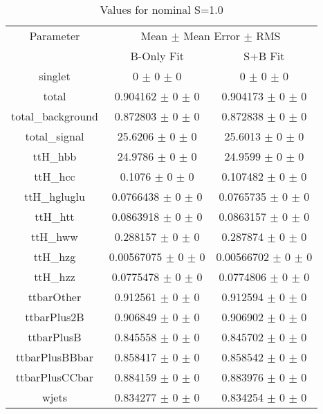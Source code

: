 \begin{table}
\centering
\caption{Values for nominal S=1.0}
\begin{tabular}{ccc}
\toprule
Parameter 	& \multicolumn{2}{c}{Mean $\pm$ Mean Error $\pm$ RMS}\\
 	& B-Only Fit & S+B Fit\\
\midrule
singlet 	& \num{0} $\pm$ \num{0} $\pm$ \num{0} 	& \num{0} $\pm$ \num{0} $\pm$ \num{0}\\
total 	& \num{0.904162} $\pm$ \num{0} $\pm$ \num{0} 	& \num{0.904173} $\pm$ \num{0} $\pm$ \num{0}\\
total\_background 	& \num{0.872803} $\pm$ \num{0} $\pm$ \num{0} 	& \num{0.872838} $\pm$ \num{0} $\pm$ \num{0}\\
total\_signal 	& \num{25.6206} $\pm$ \num{0} $\pm$ \num{0} 	& \num{25.6013} $\pm$ \num{0} $\pm$ \num{0}\\
ttH\_hbb 	& \num{24.9786} $\pm$ \num{0} $\pm$ \num{0} 	& \num{24.9599} $\pm$ \num{0} $\pm$ \num{0}\\
ttH\_hcc 	& \num{0.1076} $\pm$ \num{0} $\pm$ \num{0} 	& \num{0.107482} $\pm$ \num{0} $\pm$ \num{0}\\
ttH\_hgluglu 	& \num{0.0766438} $\pm$ \num{0} $\pm$ \num{0} 	& \num{0.0765735} $\pm$ \num{0} $\pm$ \num{0}\\
ttH\_htt 	& \num{0.0863918} $\pm$ \num{0} $\pm$ \num{0} 	& \num{0.0863157} $\pm$ \num{0} $\pm$ \num{0}\\
ttH\_hww 	& \num{0.288157} $\pm$ \num{0} $\pm$ \num{0} 	& \num{0.287874} $\pm$ \num{0} $\pm$ \num{0}\\
ttH\_hzg 	& \num{0.00567075} $\pm$ \num{0} $\pm$ \num{0} 	& \num{0.00566702} $\pm$ \num{0} $\pm$ \num{0}\\
ttH\_hzz 	& \num{0.0775478} $\pm$ \num{0} $\pm$ \num{0} 	& \num{0.0774806} $\pm$ \num{0} $\pm$ \num{0}\\
ttbarOther 	& \num{0.912561} $\pm$ \num{0} $\pm$ \num{0} 	& \num{0.912594} $\pm$ \num{0} $\pm$ \num{0}\\
ttbarPlus2B 	& \num{0.906849} $\pm$ \num{0} $\pm$ \num{0} 	& \num{0.906902} $\pm$ \num{0} $\pm$ \num{0}\\
ttbarPlusB 	& \num{0.845558} $\pm$ \num{0} $\pm$ \num{0} 	& \num{0.845702} $\pm$ \num{0} $\pm$ \num{0}\\
ttbarPlusBBbar 	& \num{0.858417} $\pm$ \num{0} $\pm$ \num{0} 	& \num{0.858542} $\pm$ \num{0} $\pm$ \num{0}\\
ttbarPlusCCbar 	& \num{0.884159} $\pm$ \num{0} $\pm$ \num{0} 	& \num{0.883976} $\pm$ \num{0} $\pm$ \num{0}\\
wjets 	& \num{0.834277} $\pm$ \num{0} $\pm$ \num{0} 	& \num{0.834254} $\pm$ \num{0} $\pm$ \num{0}\\
\bottomrule
\end{tabular}
\end{table}